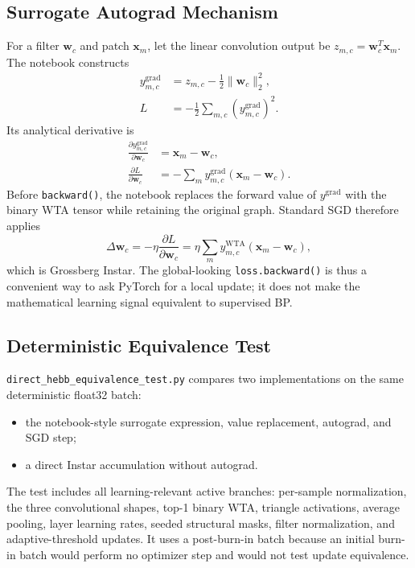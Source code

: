 \documentclass{article}
\begin{document}
    \subsection{Surrogate Autograd Mechanism}
    
    For a filter $\mathbf{w}_c$ and patch $\mathbf{x}_m$, let the linear convolution output be $z_{m,c} = \mathbf{w}_c^T \mathbf{x}_m$. The notebook constructs
    \begin{align}
    y^{\text{grad}}_{m,c} &= z_{m,c} - \frac{1}{2} \|\mathbf{w}_c\|_2^2, \\
    L &= -\frac{1}{2} \sum_{m,c} (y^{\text{grad}}_{m,c})^2.
    \end{align}
    Its analytical derivative is
    \begin{align}
    \frac{\partial y^{\text{grad}}_{m,c}}{\partial \mathbf{w}_c} &= \mathbf{x}_m - \mathbf{w}_c, \\
    \frac{\partial L}{\partial \mathbf{w}_c} &= -\sum_m y^{\text{grad}}_{m,c} (\mathbf{x}_m - \mathbf{w}_c).
    \end{align}
    Before \texttt{backward()}, the notebook replaces the forward value of $y^{\text{grad}}$ with the binary WTA tensor while retaining the original graph. Standard SGD therefore applies
    \begin{equation}
    \Delta \mathbf{w}_c = -\eta \frac{\partial L}{\partial \mathbf{w}_c} = \eta \sum_m y^{\text{WTA}}_{m,c} (\mathbf{x}_m - \mathbf{w}_c),
    \end{equation}
    which is Grossberg Instar. The global-looking \texttt{loss.backward()} is thus a convenient way to ask PyTorch for a local update; it does not make the mathematical learning signal equivalent to supervised BP.
    
    \subsection{Deterministic Equivalence Test}
    
    \texttt{direct\_hebb\_equivalence\_test.py} compares two implementations on the same deterministic float32 batch:
    \begin{itemize}[noitemsep]
    \item the notebook-style surrogate expression, value replacement, autograd, and SGD step;
    \item a direct Instar accumulation without autograd.
    \end{itemize}
    The test includes all learning-relevant active branches: per-sample normalization, the three convolutional shapes, top-1 binary WTA, triangle activations, average pooling, layer learning rates, seeded structural masks, filter normalization, and adaptive-threshold updates. It uses a post-burn-in batch because an initial burn-in batch would perform no optimizer step and would not test update equivalence.
    
\end{document}
